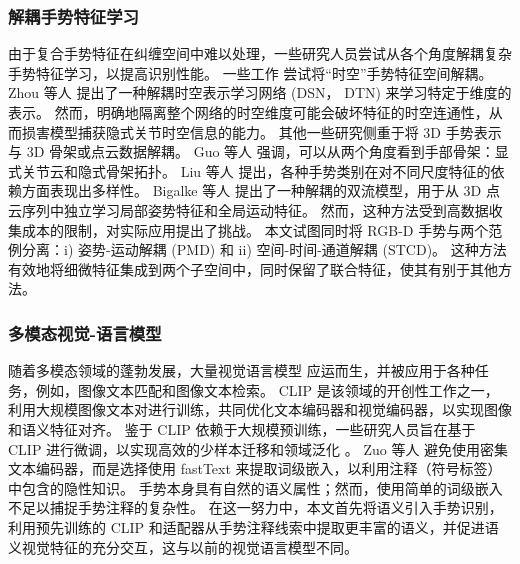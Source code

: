 \subsubsection{解耦手势特征学习}
由于复合手势特征在纠缠空间\cite{zhou2023unified,LI2024110536}中难以处理，一些研究人员尝试从各个角度解耦复杂手势特征学习，以提高识别性能。
一些工作\cite{zhou2022decoupling,LI2024110536} 尝试将“时空”手势特征空间解耦。
Zhou 等人 \cite{zhou2023unified} 提出了一种解耦时空表示学习网络 (DSN， DTN) 来学习特定于维度的表示。
然而，明确地隔离整个网络的时空维度可能会破坏特征的时空连通性，从而损害模型捕获隐式关节时空信息的能力。
其他一些研究侧重于将 3D 手势表示与 3D 骨架或点云数据解耦。
Guo 等人 \cite{GUO2021108044} 强调，可以从两个角度看到手部骨架：显式关节云和隐式骨架拓扑。
Liu 等人\cite{liu2020decoupled} 提出，各种手势类别在对不同尺度特征的依赖方面表现出多样性。
Bigalke 等人 \cite{bigalke2021fusing} 提出了一种解耦的双流模型，用于从 3D 点云序列中独立学习局部姿势特征和全局运动特征。
然而，这种方法受到高数据收集成本的限制，对实际应用提出了挑战。
本文试图同时将 RGB-D 手势与两个范例分离：i) 姿势-运动解耦 (PMD) 和 ii) 空间-时间-通道解耦 (STCD)。
这种方法有效地将细微特征集成到两个子空间中，同时保留了联合特征，使其有别于其他方法。

\subsubsection{多模态视觉-语言模型}
随着多模态领域的蓬勃发展，大量视觉语言模型 \cite{radford2021learning, li2022blip} 应运而生，并被应用于各种任务，例如，图像文本匹配和图像文本检索。
CLIP \cite{radford2021learning} 是该领域的开创性工作之一，利用大规模图像文本对进行训练，共同优化文本编码器和视觉编码器，以实现图像和语义特征对齐。
鉴于 CLIP 依赖于大规模预训练，一些研究人员旨在基于 CLIP 进行微调，以实现高效的少样本迁移和领域泛化 \cite{gao2024clip}。
Zuo 等人 \cite{zuo2023natural} 避免使用密集文本编码器，而是选择使用 fastText 来提取词级嵌入，以利用注释（符号标签）中包含的隐性知识。
手势本身具有自然的语义属性；然而，使用简单的词级嵌入不足以捕捉手势注释的复杂性。
在这一努力中，本文首先将语义引入手势识别，利用预先训练的 CLIP 和适配器从手势注释线索中提取更丰富的语义，并促进语义视觉特征的充分交互，这与以前的视觉语言模型不同。





